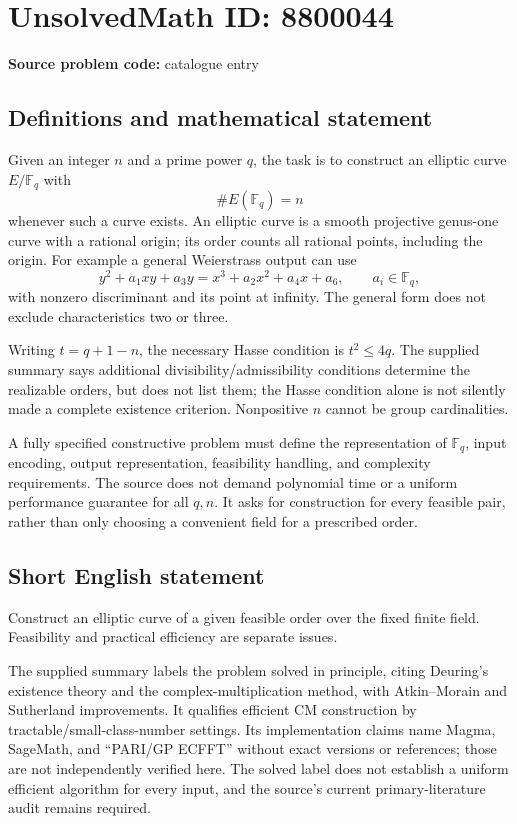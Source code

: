 \documentclass[11pt]{article}
\newcommand{\F}{\mathbb{F}}
\begin{document}
\section*{UnsolvedMath ID: 8800044}
\textbf{Source problem code:} catalogue entry
\subsection{Definitions and mathematical statement}
Given an integer $n$ and a prime power $q$, the task is to construct an elliptic curve $E/\F_q$ with
\[
 \#E(\F_q)=n
\]
whenever such a curve exists. An elliptic curve is a smooth projective genus-one curve with a rational origin; its order counts all rational points, including the origin. For example a general Weierstrass output can use
\[
 y^2+a_1xy+a_3y=x^3+a_2x^2+a_4x+a_6,
 \qquad a_i\in\F_q,
\]
with nonzero discriminant and its point at infinity. The general form does not exclude characteristics two or three.

Writing $t=q+1-n$, the necessary Hasse condition is $t^2\le4q$. The supplied summary says additional divisibility/admissibility conditions determine the realizable orders, but does not list them; the Hasse condition alone is not silently made a complete existence criterion. Nonpositive $n$ cannot be group cardinalities.

A fully specified constructive problem must define the representation of $\F_q$, input encoding, output representation, feasibility handling, and complexity requirements. The source does not demand polynomial time or a uniform performance guarantee for all $q,n$. It asks for construction for every feasible pair, rather than only choosing a convenient field for a prescribed order.
\subsection{Short English statement}
Construct an elliptic curve of a given feasible order over the fixed finite field. Feasibility and practical efficiency are separate issues.

The supplied summary labels the problem solved in principle, citing Deuring's existence theory and the complex-multiplication method, with Atkin--Morain and Sutherland improvements. It qualifies efficient CM construction by tractable/small-class-number settings. Its implementation claims name Magma, SageMath, and ``PARI/GP ECFFT'' without exact versions or references; those are not independently verified here. The solved label does not establish a uniform efficient algorithm for every input, and the source's current primary-literature audit remains required.
\end{document}
